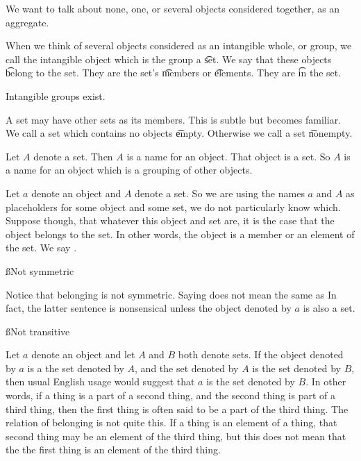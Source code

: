 

We want to talk about none, one, or several objects considered together, as an aggregate.


When we think of several objects considered as an intangible whole, or group, we call the intangible object which is the group a \t{set}.
We say that these objects \t{belong} to the set.
They are the set's \t{members} or \t{elements}.
They are \t{in} the set.

\begin{principle}
	Intangible groups exist.
\end{principle}

A set may have other sets as its members.
This is subtle but becomes familiar.
We call a set which contains no objects \t{empty}.
Otherwise we call a set \t{nonempty}.


Let $A$ denote a set.
Then $A$ is a name for an object.
That object is a set.
So $A$ is a name for an object which is a grouping of other objects.


Let $a$ denote an object and $A$ denote a set.
So we are using the names $a$ and $A$ as placeholders for some object and some set, we do not particularly know which.
Suppose though, that whatever this object and set are, it is the case that the object belongs to the set.
In other words, the object is a member or an element of the set.
We say .

\ss{Not symmetric}

Notice that belonging is not symmetric.
Saying  does not mean the same as 
In fact, the latter sentence is nonsensical unless the object denoted by $a$ is also a set.

\ss{Not transitive}

Let $a$ denote an object and let $A$ and $B$ both denote sets.
If the object denoted by $a$ is  a the set denoted by $A$, and the set denoted by $A$ is  the set denoted by $B$, then usual English usage would suggest that $a$ is  the set denoted by $B$.
In other words, if a thing is a part of a second thing, and the second thing is part of a third thing, then the first thing is often said to be a part of the third thing.
The relation of belonging is not quite this.
If a thing is an element of a thing, that second thing may be an element of the third thing, but this does not mean that the the first thing is an element of the third thing.

